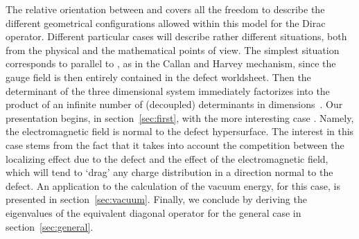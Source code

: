\documentclass[a4paper,12pt]{article}
\providecommand{\Fd}{\widetilde{F}}
\providecommand{\n}{\eta}
\begin{document}
The relative orientation between \myHighlight{$\n_\mu$}\coordHE{} and \myHighlight{$\Fd_\mu$}\coordHE{} covers all the
freedom to describe the different geometrical configurations allowed
within this model for the Dirac operator. Different particular cases
will describe rather different situations, both from the physical and
the mathematical points of view. The simplest situation corresponds to
\myHighlight{$\eta$}\coordHE{} parallel to \coordHE{}, as in the Callan and Harvey mechanism,
since the gauge field is then entirely contained in the defect
worldsheet. Then the determinant of the three dimensional system
immediately factorizes into the product of an infinite number of
(decoupled) determinants in \coordHE{} dimensions~\cite{paper2+1}.  Our
presentation begins, in section~\ref{sec:first}, with the more
interesting case \myHighlight{$\Fd \cdot \n=0$}\coordHE{}.  Namely, the electromagnetic field is
normal to the defect hypersurface.  The interest in this case stems
from the fact that it takes into account the competition between the
localizing effect due to the defect and the effect of the
electromagnetic field, which will tend to `drag' any charge
distribution in a direction normal to the defect.  An application to
the calculation of the vacuum energy, for this case, is presented in
section~\ref{sec:vacuum}.  Finally, we conclude by deriving the
eigenvalues of the equivalent diagonal operator for the general case
in section~\ref{sec:general}.
\end{document}
